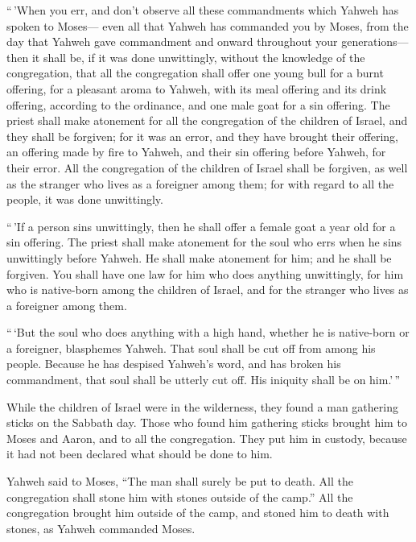  ``\,'When you err, and don't observe all these
commandments which Yahweh has spoken to Moses---  even
all that Yahweh has commanded you by Moses, from the day that Yahweh
gave commandment and onward throughout your generations---
 then it shall be, if it was done unwittingly, without
the knowledge of the congregation, that all the congregation shall offer
one young bull for a burnt offering, for a pleasant aroma to Yahweh,
with its meal offering and its drink offering, according to the
ordinance, and one male goat for a sin offering.  The
priest shall make atonement for all the congregation of the children of
Israel, and they shall be forgiven; for it was an error, and they have
brought their offering, an offering made by fire to Yahweh, and their
sin offering before Yahweh, for their error.  All the
congregation of the children of Israel shall be forgiven, as well as the
stranger who lives as a foreigner among them; for with regard to all the
people, it was done unwittingly.

 ``\,'If a person sins unwittingly, then he shall offer a
female goat a year old for a sin offering.  The priest
shall make atonement for the soul who errs when he sins unwittingly
before Yahweh. He shall make atonement for him; and he shall be
forgiven.  You shall have one law for him who does
anything unwittingly, for him who is native-born among the children of
Israel, and for the stranger who lives as a foreigner among them.

 ``\,`But the soul who does anything with a high hand,
whether he is native-born or a foreigner, blasphemes Yahweh. That soul
shall be cut off from among his people.  Because he has
despised Yahweh's word, and has broken his commandment, that soul shall
be utterly cut off. His iniquity shall be on him.'\,''

 While the children of Israel were in the wilderness,
they found a man gathering sticks on the Sabbath day. 
Those who found him gathering sticks brought him to Moses and Aaron, and
to all the congregation.  They put him in custody,
because it had not been declared what should be done to him.

 Yahweh said to Moses, ``The man shall surely be put to
death. All the congregation shall stone him with stones outside of the
camp.''  All the congregation brought him outside of the
camp, and stoned him to death with stones, as Yahweh commanded Moses.

